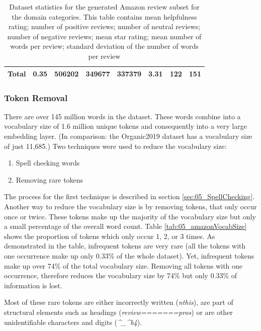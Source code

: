 \begin{table}
\begin{tabularx}{\textwidth}{lXrrrcrr}
		\midrule
		Total						&	0.35 & 	   506202 &	349677& 337379&    3.31 &	 122 &  151 \\
		\bottomrule
	\end{tabularx}
	\caption{Dataset statistics for the generated Amazon review subset for the domain categories. This table contains mean helpfulness rating; number of positive reviews; number of neutral reviews; number of negative reviews; mean star rating; mean number of words per review; standard deviation of the number of words per review }
		\label{tab:05_amazonDatasetStats}
\end{table}

\subsubsection*{Token Removal}
There are over 145 million words in the dataset. These words combine into a vocabulary size of 1.6 million unique tokens and consequently into a very large embedding layer. {(In comparison: the Organic2019 dataset has a vocabulary size of just 11,685.)} Two techniques were used to reduce the vocabulary size:

\begin{enumerate}
	\item Spell checking words
	\item Removing rare tokens
\end{enumerate}

The process for the first technique is described in section \ref{sec:05_SpellChecking}. Another way to reduce the vocabulary size is by removing tokens, that only occur once or twice. These tokens make up the majority of the vocabulary size but only a small percentage of the overall word count. Table \ref{tab:05_amazonVocabSize} shows the proportion of tokens which only occur 1, 2, or 3 times. As demonstrated in the table, infrequent tokens are very rare {(all the tokens with one occurrence make up only 0.33\% of the whole dataset)}. Yet, infrequent tokens make up over 74\% of the total vocabulary size. Removing all tokens with one occurrence, therefore reduces the vocabulary size by 74\% but only 0.33\% of information is lost.

Most of these rare tokens are either incorrectly written {(\textit{nthis})}, are part of structural elements such as headings {(\textit{review=======pros})} or are other unidentifiable characters and digits ({\textit{\^{}\_\^{}b4}}).

